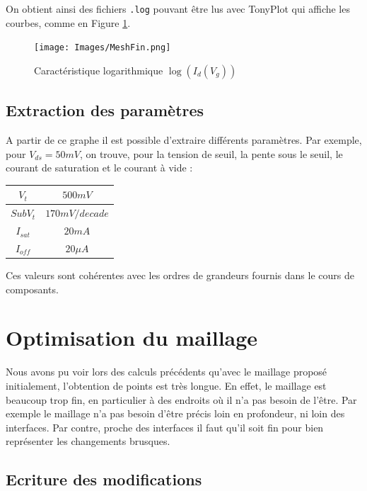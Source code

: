 \documentclass[a4paper,11pt]{report}
\begin{document}
On obtient ainsi des fichiers \texttt{.log} pouvant être lus avec TonyPlot qui affiche les courbes, comme en Figure \ref{logIdVgmeshfin}.

\begin{figure}[H]
\centering
    \texttt{[image: Images/MeshFin.png]}
    \caption{Caractéristique logarithmique $\log(I_d(V_g))$}
    \label{logIdVgmeshfin}
\end{figure}

\section{Extraction des paramètres}
A partir de ce graphe il est possible d'extraire différents paramètres. Par exemple, pour $V_{ds}=50mV$, on trouve, pour la tension de seuil, la pente sous le seuil, le courant de saturation et le courant à vide :

\begin{tableau}[H]
\centering
\begin{tabular}{|c|c|}
\hline
$V_t$&$500mV$\\
\hline
$SubV_t$&$170mV/decade$\\
\hline
$I_{sat}$&$20mA$\\
\hline
$I_{off}$&$20\mu A$\\
\hline
\end{tabular}
\caption{Caractéristiques avec un maillage fin pour $V_{ds}=50mV$}

Ces valeurs sont cohérentes avec les ordres de grandeurs fournis dans le cours de composants.

\end{tableau}


\chapter{Optimisation du maillage}

Nous avons pu voir lors des calculs précédents qu'avec le maillage proposé initialement, l'obtention de points est très longue. En effet, le maillage est beaucoup trop fin, en particulier à des endroits où il n'a pas besoin de l'être. Par exemple le maillage n'a pas besoin d'être précis loin en profondeur, ni loin des interfaces. Par contre, proche des interfaces il faut qu'il soit fin pour bien représenter les changements brusques.
 
\section{Ecriture des modifications}
\end{document}
